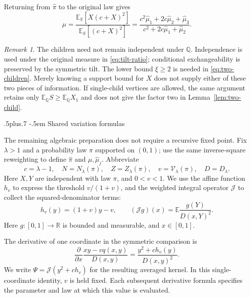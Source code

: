 \documentclass[11pt,reqno]{amsart}
\makeatletter
\def\subsection{\@startsection{subsection}{2}{0pt}%
  {.5\linespacing plus.7\linespacing}
  {-.5em}
  {\normalfont\scshape}}
\theoremstyle{plain}
\theoremstyle{definition}
\theoremstyle{remark}
\newtheorem{remark}[theorem]{Remark}
\numberwithin{equation}{section}
\newcommand{\E}{\mathbb E}
\newcommand{\cJ}{\mathcal J}
\makeatother
\begin{document}
Returning from $\widehat\pi$ to the original law gives
\begin{equation}\label{eq:undo-tilt}
 \mu=
 \frac{\E_{\widehat\pi}[X(c+X)^2]}{\E_{\widehat\pi}[(c+X)^2]}
 =\frac{c^2\widehat\mu_1+2c\widehat\mu_2+\widehat\mu_3}
        {c^2+2c\widehat\mu_1+\widehat\mu_2}.
\end{equation}

\begin{remark}\label{rem:why-two}
The children need not remain independent under $\mathbb Q$. Independence is used
under the original measure in \eqref{eq:tilt-ratio}; conditional exchangeability
is preserved by the symmetric tilt. The lower bound
$\xi\ge2$ is needed in \eqref{eq:two-children}. Merely knowing a support bound
for $X$ does not supply either of these two pieces of information. If
single-child vertices are allowed, the same argument retains only
$\E_{\mathbb Q}S\ge \E_{\mathbb Q}X_1$ and does not give the factor two in Lemma~\ref{lem:two-child}.
\end{remark}

\subsection{Shared variation formulas}

The remaining algebraic preparation does not require a recursive fixed
point. Fix $\lambda>1$ and a probability law $\pi$ supported on $(0,1)$;
use the same inverse-square reweighting to define $\widehat\pi$ and
$\mu,\widehat\mu_j$. Abbreviate
\begin{equation}\label{eq:basepoint}
 c=\lambda-1,\quad N=N_\lambda(\pi),\quad Z=Z_\lambda(\pi),\quad v=\mathcal V_\lambda(\pi),
 \quad D=D_\lambda.
\end{equation}
Here $X,Y$ are independent with law $\pi$, and $0<v<1$. We use the affine function
$h_v$ to express the threshold $v/(1+v)$, and the weighted integral
operator $\cJ$ to collect the squared-denominator terms:
\begin{equation}\label{eq:J-h}
 h_v(y)=(1+v)y-v,
 \qquad
 (\cJ g)(x)=\E\frac{g(Y)}{D(x,Y)^2}.
\end{equation}
Here $g:[0,1]\to\mathbb R$ is bounded and measurable, and $x\in[0,1]$.

The derivative of one coordinate in the symmetric comparison is
\begin{equation}\label{eq:variation-kernel}
 \frac{\partial}{\partial x}
       \frac{xy-vq(x,y)}{D(x,y)}
 =\frac{y^2+c h_v(y)}{D(x,y)^2}.
\end{equation}
We write $\Psi=\cJ(y^2+c h_v)$ for the resulting averaged kernel.
In this single-coordinate identity, $v$ is held fixed. Each subsequent
derivative formula specifies the parameter and law at which this value
is evaluated.
\end{document}
